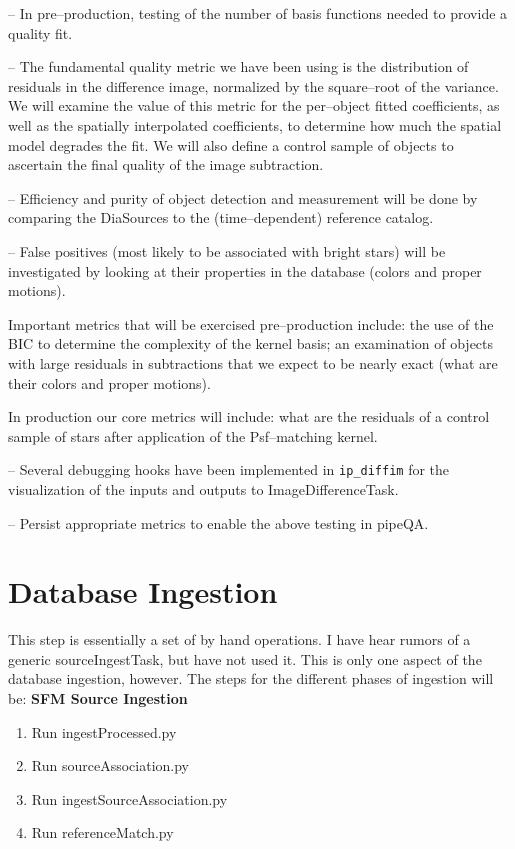 \documentclass[12pt]{article}
\begin{document}
-- In pre--production, testing of the number of basis functions needed
to provide a quality fit.  

-- The fundamental quality metric we have been using is the
distribution of residuals in the difference image, normalized by the
square--root of the variance.  We will examine the value of this
metric for the per--object fitted coefficients, as well as the
spatially interpolated coefficients, to determine how much the spatial
model degrades the fit.  We will also define a control sample of
objects to ascertain the final quality of the image subtraction.

-- Efficiency and purity of object detection and measurement will be
done by comparing the DiaSources to the (time--dependent) reference
catalog.

-- False positives (most likely to be associated with bright stars)
will be investigated by looking at their properties in the database
(colors and proper motions).

Important metrics that will be exercised pre--production include: the
use of the BIC to determine the complexity of the kernel basis; an
examination of objects with large residuals in subtractions that we
expect to be nearly exact (what are their colors and proper motions).

In production our core metrics will include: what are the residuals of
a control sample of stars after application of the Psf--matching
kernel.

-- Several debugging hooks have been implemented in {\tt ip\_diffim} for
the visualization of the inputs and outputs to ImageDifferenceTask.

-- Persist appropriate metrics to enable the above testing in pipeQA.


\clearpage 
\section{Database Ingestion} 
This step is essentially a set of by hand operations.  I have hear rumors of
a generic sourceIngestTask, but have not used it.  This is only one aspect of the
database ingestion, however.  The steps for the different phases of ingestion will be:
{\bf SFM Source Ingestion}
\begin{enumerate}
\item Run ingestProcessed.py
\item Run sourceAssociation.py
\item Run ingestSourceAssociation.py
\item Run referenceMatch.py
\end{enumerate}
\end{document}
